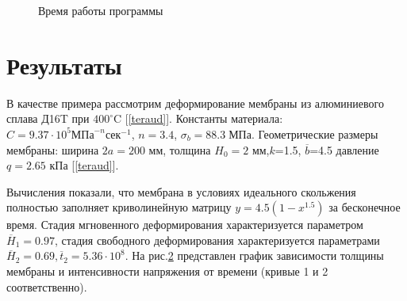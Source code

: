 		\begin{figure}[h!]
				\caption{ Время работы программы } 
				\label{parall_results}
	    \end{figure}
	    
\section{Результаты\label{chapter_2}}
	В качестве примера рассмотрим деформирование мембраны из алюминиевого сплава Д16T при $400^\circ\text{C}$ [\ref{teraud}]. Константы материала: 
   $C=9.37\cdot10^5 \text{МПа}^{-n}\text{сек}^{-1}$, $n=3.4$, $\sigma_b = 88.3\; \text{МПа}$. 
   Геометрические размеры мембраны: ширина $2a=200$ мм, толщина $H_0=2$ мм,$k$=1.5, $\overline{b}$=4.5 давление $q=2.65$ кПа [\ref{teraud}].  
   
   Вычисления показали, что мембрана в условиях идеального скольжения полностью заполняет криволинейную матрицу $y=4.5(1-x^{1.5})$ за бесконечное время. 
   Стадия мгновенного деформирования характеризуется параметром $\overline{H}_1 = 0.97$, 
   стадия свободного деформирования характеризуется параметрами $\overline{H}_2 = 0.69, \overline{t}_2 = 5.36 \cdot 10^8$.
   На рис.\ref{quad_sliging} представлен график зависимости толщины мембраны и интенсивности напряжения от времени
   (кривые 1 и 2 соответственно).
   
   		\begin{figure}[h!]	
				\def\svgwidth{\columnwidth}
				\caption{} 
				\label{quad_sliging}
		\end{figure}
		
